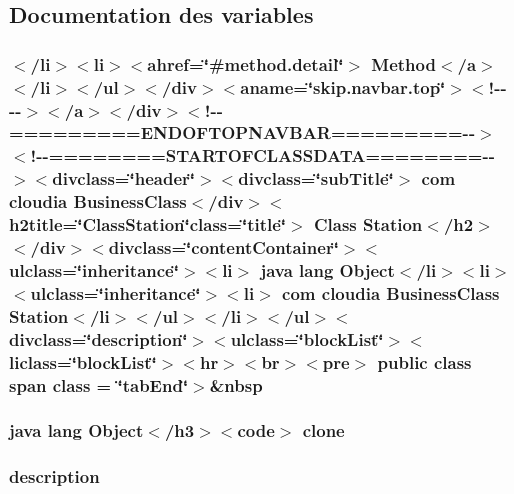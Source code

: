 \subsection{Documentation des variables}
\hypertarget{_station_8html_ac5201036ae28c42eb4a32886e17d8ef7}{
\subsubsection[{class}]{\setlength{\rightskip}{0pt plus 5cm}$<$/li$>$$<$li$>$$<$ahref=\char`\"{}\#method.\-detail\char`\"{}$>$ Method$<$/{\bf a}$>$$<$/li$>$$<$/ul$>$$<$/div$>$$<$aname=\char`\"{}skip.\-navbar.\-top\char`\"{}$>$$<$!-\/-\/-\/-\/$>$$<$/a$>$$<$/div$>$$<$!-\/-\/=========E\-N\-D\-O\-F\-T\-O\-P\-N\-A\-V\-B\-A\-R=========-\/-\/$>$$<$!-\/-\/========S\-T\-A\-R\-T\-O\-F\-C\-L\-A\-S\-S\-D\-A\-T\-A========-\/-\/$>$$<$divclass=\char`\"{}header\char`\"{}$>$$<$divclass=\char`\"{}sub\-Title\char`\"{}$>$ com cloudia Business\-Class$<$/div$>$$<$h2title=\char`\"{}Class\-Station\char`\"{}class=\char`\"{}title\char`\"{}$>$ Class {\bf Station}$<$/h2$>$$<$/div$>$$<$divclass=\char`\"{}content\-Container\char`\"{}$>$$<$ulclass=\char`\"{}inheritance\char`\"{}$>$$<$li$>$ java lang Object$<$/li$>$$<$li$>$$<$ulclass=\char`\"{}inheritance\char`\"{}$>$$<$li$>$ com cloudia Business\-Class {\bf Station}$<$/li$>$$<$/ul$>$$<$/li$>$$<$/ul$>$$<$divclass=\char`\"{}description\char`\"{}$>$$<$ulclass=\char`\"{}block\-List\char`\"{}$>$$<$liclass=\char`\"{}block\-List\char`\"{}$>$$<$hr$>$$<$br$>$$<$pre$>$ public class {\bf span} class = \char`\"{}tab\-End\char`\"{}$>$\&nbsp}}\label{_station_8html_ac5201036ae28c42eb4a32886e17d8ef7}
\hypertarget{_station_8html_adc9607fcabf6f2d7f401ad52015ef6e0}{
\subsubsection[{clone}]{\setlength{\rightskip}{0pt plus 5cm}java lang Object$<$/h3$>$$<$code$>$ clone}}\label{_station_8html_adc9607fcabf6f2d7f401ad52015ef6e0}
\hypertarget{_station_8html_a2661f439a4a94ffdcd5e47ae1da0bb1d}{
\subsubsection[{description}]{\setlength{\rightskip}{0pt plus 5cm}description}}\label{_station_8html_a2661f439a4a94ffdcd5e47ae1da0bb1d}
